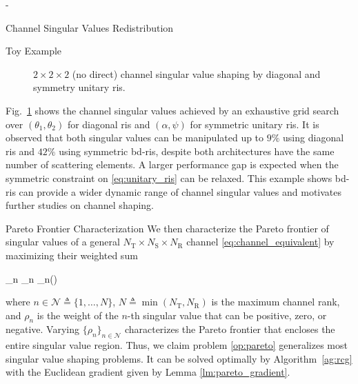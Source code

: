 \begin{section}{-}
\begin{subsection}{Channel Singular Values Redistribution}
\begin{subsubsection}{Toy Example}
\begin{figure}
				\caption{$2 \times 2 \times 2$ (no direct) channel singular value shaping by diagonal and symmetry unitary \gls{ris}.}
				\label{fg:singular_trend}
			\end{figure}
			Fig.~\ref{fg:singular_trend} shows the channel singular values achieved by an exhaustive grid search over $(\theta_1, \theta_2)$ for diagonal \gls{ris} and $(\alpha, \psi)$ for symmetric unitary \gls{ris}.
			It is observed that both singular values can be manipulated up to $9\%$ using diagonal \gls{ris} and $42\%$ using symmetric \gls{bd}-\gls{ris}, despite both architectures have the same number of scattering elements.
			A larger performance gap is expected when the symmetric constraint on \eqref{eq:unitary_ris} can be relaxed.
			This example shows \gls{bd}-\gls{ris} can provide a wider dynamic range of channel singular values and motivates further studies on channel shaping.
		\end{subsubsection}

		\begin{subsubsection}{Pareto Frontier Characterization}\label{sc:pareto_frontier}
			We then characterize the Pareto frontier of singular values of a general $N_\mathrm{T} \times N_\mathrm{S} \times N_\mathrm{R}$ channel \eqref{eq:channel_equivalent} by maximizing their weighted sum
			\begin{maxi!}
				{\scriptstyle{\mathbf{\Theta}}}{\sum_n \rho_n \sigma_n()}{\label{op:pareto}}{\label{ob:pareto}}
			\end{maxi!}
			where $n \in \mathcal{N} \triangleq \{1,\ldots,N\}$, $N \triangleq \min(N_\mathrm{T}, N_\mathrm{R})$ is the maximum channel rank, and $\rho_n$ is the weight of the $n$-th singular value that can be positive, zero, or negative.
			Varying $\{\rho_n\}_{n \in \mathcal{N}}$ characterizes the Pareto frontier that encloses the entire singular value region.
			Thus, we claim problem \eqref{op:pareto} generalizes most singular value shaping problems.
			It can be solved optimally by Algorithm~\ref{ag:rcg} with the Euclidean gradient given by Lemma \ref{lm:pareto_gradient}.


\end{subsubsection}
\end{subsection}
\end{section}
